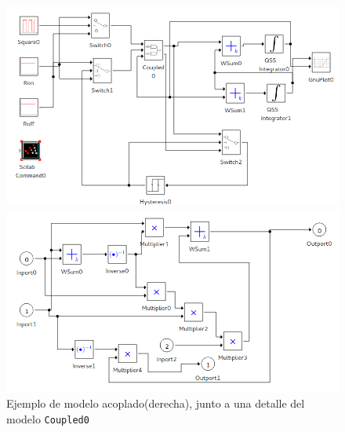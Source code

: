 \documentclass{beamer}
\begin{document}
\begin{frame}[fragile]
\begin{figure}[H]
        \begin{minipage}{0.5\textwidth}
        \includegraphics[width=\linewidth]{buck_disk}
        \end{minipage}
        \begin{minipage}{0.5\textwidth}
        \includegraphics[width=\linewidth]{buck_disk_coupled0}
        \end{minipage}
 \caption{Ejemplo de modelo acoplado(derecha), junto a una detalle del modelo \texttt{Coupled0}}\label{fig:coupledsample}
\end{figure}
\end{frame}
\end{document}
